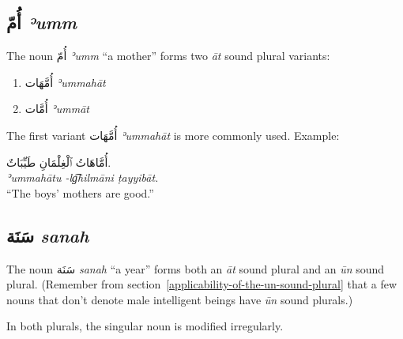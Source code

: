 \documentclass[
  10pt,
]{book}
\providecommand{\tightlist}{%
  \setlength{\itemsep}{0pt}\setlength{\parskip}{0pt}}
\begin{document}
\subsection{\texorpdfstring{\foreignlanguage{arabic}{أُمّ} \emph{ʾumm}}{أُمّ ʾumm}}\label{ux623ux645-eumm}

The noun
\foreignlanguage{arabic}{أُمّ} \emph{ʾumm} \enquote{a mother}
forms two \emph{āt} sound plural variants:

\begin{enumerate}
\def\labelenumi{\roman{enumi}.}
\tightlist
\item
  \foreignlanguage{arabic}{أُمَّهَات} \emph{ʾummahāt}
\item
  \foreignlanguage{arabic}{أُمَّات} \emph{ʾummāt}
\end{enumerate}

The first variant
\foreignlanguage{arabic}{أُمَّهَات} \emph{ʾummahāt}
is more commonly used.
Example:

\foreignlanguage{arabic}{أُمَّاهَاتُ ٱلْغِلْمَانِ طَيِّبَاتٌ.}\\
\emph{ʾummahātu -lg͡hilmāni ṭayyibāt.}\\
\enquote{The boys' mothers are good.}

\subsection{\texorpdfstring{\foreignlanguage{arabic}{سَنَة} \emph{sanah}}{سَنَة sanah}}\label{ux633ux646ux629-sanah}

The noun
\foreignlanguage{arabic}{سَنَة} \emph{sanah} \enquote{a year}
forms both an \emph{āt} sound plural
and an \emph{ūn} sound plural.
(Remember from
section~\ref{applicability-of-the-un-sound-plural}
that a few nouns that don't denote male intelligent beings have \emph{ūn} sound plurals.)

In both plurals, the singular noun is modified irregularly.
\end{document}
